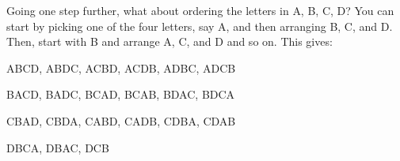 \documentclass[10pt,]{book}
\numberwithin{equation}{section}
\begin{document}
\par
\hypertarget{p-365}{}%
Going one step further, what about ordering the letters in {A, B, C, D}? You can start by picking one of the four letters, say A, and then arranging B, C, and D.  Then, start with B and arrange A, C, and D and so on.  This gives:%
\par
\hypertarget{p-366}{}%
ABCD, ABDC, ACBD, ACDB, ADBC, ADCB%
\par
\hypertarget{p-367}{}%
BACD, BADC, BCAD, BCAB, BDAC, BDCA%
\par
\hypertarget{p-368}{}%
CBAD, CBDA, CABD, CADB, CDBA, CDAB%
\par
\hypertarget{p-369}{}%
DBCA, DBAC, DCB
\end{document}
